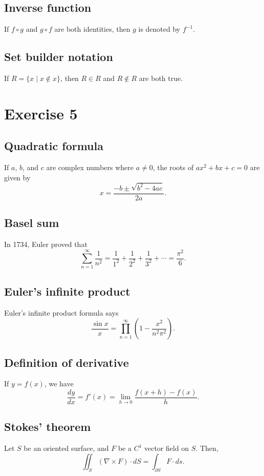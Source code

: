 \documentclass{amsart}
\numberwithin{equation}{section}
\begin{document}
\subsection{Inverse function}
If $f \circ g$ and $g \circ f$ are both identities, then
$g$ is denoted by $f^{-1}$.

\subsection{Set builder notation}
If $R = \{x \mid x \not\in x\}$, then $R \in R$ and $R \not\in R$
are both true.


\section{Exercise 5}

\subsection{Quadratic formula}
If $a$, $b$, and $c$ are complex numbers where $a \ne 0$, the roots of
$ax^2 + bx + c = 0$ are given by
\[
x = \frac{-b \pm \sqrt{b^2 - 4ac}}{2a}.
\]

\subsection{Basel sum}
In 1734, Euler proved that
\[
\sum_{n=1}^\infty \frac{1}{n^2} = \frac{1}{1^2} + \frac{1}{2^2} + \frac{1}{3^2}
+ \cdots = \frac{\pi^2}{6}.
\]

\subsection{Euler's infinite product}
Euler's infinite product formula says
\[
\frac{\sin x}{x} = \prod_{n=1}^{\infty} \left(1 - \frac{x^2}{n^2\pi^2}\right).
\]

\subsection{Definition of derivative}
If $y = f(x)$, we have
\[ \frac{dy}{dx} = f'(x) = \lim_{h\to0} \frac{f(x+h)-f(x)}{h}. \]

\subsection{Stokes' theorem}
Let $S$ be an oriented surface, and $F$ be a $C^1$ vector field on $S$.
Then,
\[
\iint_S (\nabla \times F) \cdot dS = \int_{\partial S} F \cdot ds.
\]
\end{document}
